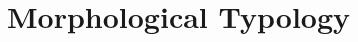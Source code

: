 \documentclass[grammar]{subfiles}
\begin{document}
\chapter{Morphological Typology}
\label{ch:morphological_typology}


%
%
%
%
%
%
\end{document}
